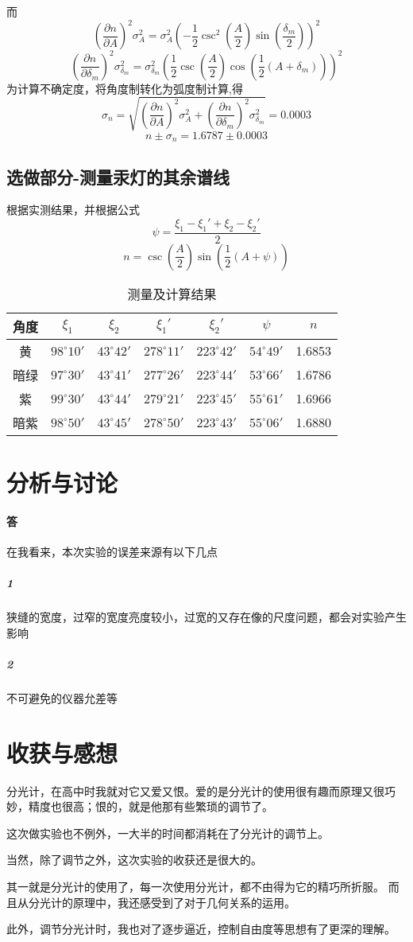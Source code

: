 \documentclass{ctexart}
\begin{document}
  而$$(\frac{\partial n}{\partial A})^2\sigma_A^2=\sigma_A^2(-\frac{1}{2} \csc ^2\left(\frac{A}{2}\right) \sin \left(\frac{\delta _m}{2}\right))^2$$
  $$(\frac{\partial n}{\partial \delta_m})^2\sigma_{\delta_m}^2=\sigma_{\delta_m}^2(\frac{1}{2} \csc \left(\frac{A}{2}\right) \cos \left(\frac{1}{2} \left(A+\delta _m\right)\right))^2$$
  为计算不确定度，将角度制转化为弧度制计算,得$$\sigma_n=\sqrt{(\frac{\partial n}{\partial A})^2\sigma_A^2+(\frac{\partial n}{\partial \delta_m})^2\sigma_{\delta_m}^2}=0.0003$$
  $$n\pm \sigma_n=1.6787\pm 0.0003$$
  \subsection{选做部分-测量汞灯的其余谱线}
  根据实测结果，并根据公式$$\psi=\frac{\xi_1-\xi_1'+\xi_2-\xi_2'}{2}$$
  $$n=\csc \left(\frac{A}{2}\right) \sin \left(\frac{1}{2} \left(A+\psi\right)\right)$$
  
\begin{table}[htbp]
    \centering
    \caption{测量及计算结果}
      \begin{tabular}{|c|c|c|c|c|c|c|}
        \hline
      角度    & {$\xi_1$} & {$\xi_2$} & {$\xi_1'$} & {$\xi_2'$} & {$\psi$} & {$n$} \\
      \hline
      黄     & $98^\circ 10'$ & $43^\circ 42'$ & $278^\circ 11'$ & $223^\circ 42'$ & $54^\circ 49'$ & 1.6853 \\
      \hline
      暗绿    & $97^\circ 30'$ & $43^\circ 41'$ & $277^\circ 26'$ & $223^\circ 44'$ & $53^\circ 66'$ & 1.6786 \\
      \hline
      紫     & $99^\circ 30'$ & $43^\circ 44'$ & $279^\circ 21'$ & $223^\circ 45'$ & $55^\circ 61'$ & 1.6966 \\
      \hline
      暗紫    & $98^\circ 50'$ & $43^\circ 45'$ & $278^\circ 50'$ & $223^\circ 43'$ & $55^\circ 06'$ & 1.6880 \\
      \hline
      \end{tabular}%
    \label{tab:addlabel}%
  \end{table}%
  
  
\section{分析与讨论}
\paragraph{答}在我看来，本次实验的误差来源有以下几点
\subparagraph{1}狭缝的宽度，过窄的宽度亮度较小，过宽的又存在像的尺度问题，都会对实验产生影响
\subparagraph{2}不可避免的仪器允差等
\section{收获与感想}
分光计，在高中时我就对它又爱又恨。爱的是分光计的使用很有趣而原理又很巧妙，精度也很高；恨的，就是他那有些繁琐的调节了。

这次做实验也不例外，一大半的时间都消耗在了分光计的调节上。

当然，除了调节之外，这次实验的收获还是很大的。

其一就是分光计的使用了，每一次使用分光计，都不由得为它的精巧所折服。
而且从分光计的原理中，我还感受到了对于几何关系的运用。

此外，调节分光计时，我也对了逐步逼近，控制自由度等思想有了更深的理解。
\end{document}
